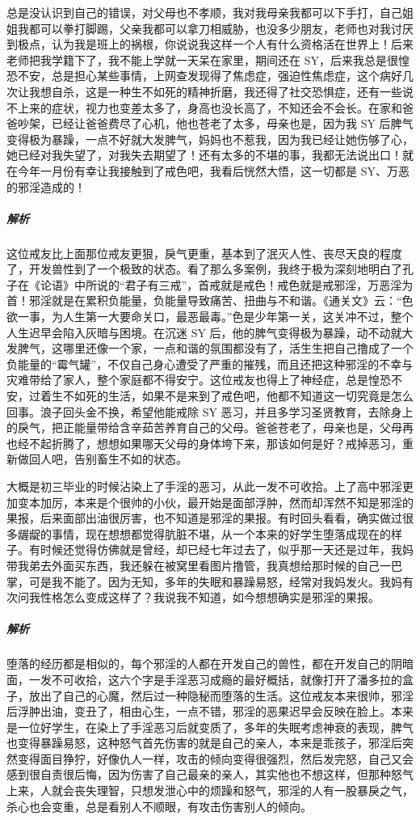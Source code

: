 \begin{case}
    总是没认识到自己的错误，对父母也不孝顺，我对我母亲我都可以下手打，自己姐姐我都可以拳打脚踢，父亲我都可以拿刀相威胁，也没多少朋友，老师也对我讨厌到极点，认为我是班上的祸根，你说说我这样一个人有什么资格活在世界上！后来老师把我学籍下了，我不能上学就一天呆在家里，期间还在 SY，后来我总是很惶恐不安，总是担心某些事情，上网查发现得了焦虑症，强迫性焦虑症，这个病好几次让我想自杀，这是一种生不如死的精神折磨，我还得了社交恐惧症，还有一些说不上来的症状，视力也变差太多了，身高也没长高了，不知还会不会长。在家和爸爸吵架，已经让爸爸费尽了心机，他也苍老了太多，母亲也是，因为我 SY 后脾气变得极为暴躁，一点不好就大发脾气，妈妈也不惹我，因为我已经让她伤够了心，她已经对我失望了，对我失去期望了！还有太多的不堪的事，我都无法说出口！就在今年一月份有幸让我接触到了戒色吧，我看后恍然大悟，这一切都是 SY、万恶的邪淫造成的！
    \subparagraph{解析} 这位戒友比上面那位戒友更狠，戾气更重，基本到了泯灭人性、丧尽天良的程度了，开发兽性到了一个极致的状态。看了那么多案例，我终于极为深刻地明白了孔子在《论语》中所说的“君子有三戒”，首戒就是戒色！戒色就是戒邪淫，万恶淫为首！邪淫就是在累积负能量，负能量导致痛苦、扭曲与不和谐。《通关文》云：“色欲一事，为人生第一大要命关口，最恶最毒。”色是少年第一关，这关冲不过，整个人生迟早会陷入灰暗与困境。在沉迷 SY 后，他的脾气变得极为暴躁，动不动就大发脾气，这哪里还像一个家，一点和谐的氛围都没有了，活生生把自己撸成了一个负能量的“霉气罐”，不仅自己身心遭受了严重的摧残，而且还把这种邪淫的不幸与灾难带给了家人，整个家庭都不得安宁。这位戒友也得上了神经症，总是惶恐不安，过着生不如死的生活，如果不是来到了戒色吧，他都不知道这一切究竟是怎么回事。浪子回头金不换，希望他能戒除 SY 恶习，并且多学习圣贤教育，去除身上的戾气，把正能量带给含辛茹苦养育自己的父母。爸爸苍老了，母亲也是，父母再也经不起折腾了，想想如果哪天父母的身体垮下来，那该如何是好？戒掉恶习，重新做回人吧，告别畜生不如的状态。
\end{case}

\begin{case}
    大概是初三毕业的时候沾染上了手淫的恶习，从此一发不可收拾。上了高中邪淫更加变本加厉，本来是个很帅的小伙，最开始是面部浮肿，然而却浑然不知是邪淫的果报，后来面部出油很厉害，也不知道是邪淫的果报。有时回头看看，确实做过很多龌龊的事情，现在想想都觉得肮脏不堪，从一个本来的好学生堕落成现在的样子。有时候还觉得仿佛就是曾经，却已经七年过去了，似乎那一天还是过年，我妈带我弟去外面买东西，我还躲在被窝里看图片撸管，我真想给那时候的自己一巴掌，可是我不能了。因为无知，多年的失眠和暴躁易怒，经常对我妈发火。我妈有次问我性格怎么变成这样了？我说我不知道，如今想想确实是邪淫的果报。
    \subparagraph{解析} 堕落的经历都是相似的，每个邪淫的人都在开发自己的兽性，都在开发自己的阴暗面，一发不可收拾，这六个字是手淫恶习成瘾的最好概括，就像打开了潘多拉的盒子，放出了自己的心魔，然后过一种隐秘而堕落的生活。这位戒友本来很帅，邪淫后浮肿出油，变丑了，相由心生，一点不错，邪淫的恶果迟早会反映在脸上。本来是一位好学生，在染上了手淫恶习后就变质了，多年的失眠考虑神衰的表现，脾气也变得暴躁易怒，这种怒气首先伤害的就是自己的亲人，本来是乖孩子，邪淫后突然变得面目狰狞，好像仇人一样，攻击的倾向变得很强烈，然后发完怒，自己又会感到很自责很后悔，因为伤害了自己最亲的亲人，其实他也不想这样，但那种怒气上来，人就会丧失理智，只想发泄心中的烦躁和怒气，邪淫的人有一股暴戾之气，杀心也会变重，总是看别人不顺眼，有攻击伤害别人的倾向。
\end{case}

